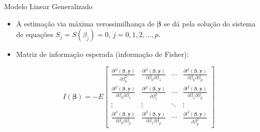 \documentclass[10pt, aspectratio=169]{beamer}
\begin{document}
\begin{frame}{Modelo Linear Generalizado} 

\begin{itemize}


\item A estimação via máxima verossimilhança de $\boldsymbol{\beta}$ se dá pela solução do sistema de equações $S_j=S(\beta_j)=0$, $j=0,1,2,...,p$.

  \vspace{0,5cm}  


\item Matriz de informação esperada (informação de Fisher):

$$
I(\boldsymbol{\beta})=-E
\begin{bmatrix}
\frac{\partial l^{2}(\boldsymbol{\beta , y})}{\partial \beta_{0}^{2}  } &
\frac{\partial l^{2}(\boldsymbol{\beta , y})}{\partial \beta_{0} \partial \beta_{1}  } &
\cdots  &  
\frac{\partial l^{2}(\boldsymbol{\beta , y})}{\partial \beta_{0} \partial \beta_{p}  }\\ 
\frac{\partial l^{2}(\boldsymbol{\beta , y})}{\partial \beta_{0} \partial \beta_{1}  } &  
\frac{\partial l^{2}(\boldsymbol{\beta , y})}{\partial \beta_{1}^{2}  } &
\cdots  &
\frac{\partial l^{2}(\boldsymbol{\beta , y})}{\partial \beta_{1} \partial \beta_{p}  }
 \\ 
\vdots & \vdots & \ddots & \vdots \\ 
\frac{\partial l^{2}(\boldsymbol{\beta , y})}{\partial \beta_{0} \partial \beta_{p}  } &
\frac{\partial l^{2}(\boldsymbol{\beta , y})}{\partial \beta_{1} \partial \beta_{p}  }  &
\cdots  & 
\frac{\partial l^{2}(\boldsymbol{\beta , y})}{\partial \beta_{p}^{2}  }
\end{bmatrix}
$$

\end{itemize}
\end{frame}



\end{document}
